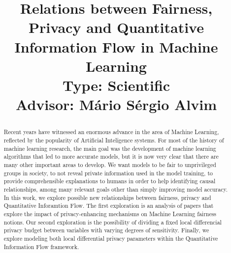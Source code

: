 \documentclass[conference]{IEEEtran}
\begin{document}
%
%
%
%
%
%
%
%



\title{Relations between Fairness, Privacy and Quantitative Information Flow in Machine Learning
            \\\large Type: Scientific\\Advisor: Mário Sérgio Alvim

}

\author{
}

\maketitle

\begin{abstract}
            Recent years have witnessed an enormous advance in the area of Machine Learning, reflected by the popularity of Artificial Inteligence systems. For most of the history of machine learning research, the main goal was the development of machine learning algorithms that led to more accurate models, but it is now very clear that there are many other important areas to develop. We want models to be fair to unprivileged groups in society, to not reveal private information used in the model training, to provide comprehensible explanations to humans in order to help identifying causal relationships, among many relevant goals other than simply improving model accuracy. In this work, we explore possible new relationships between fairness, privacy and Quantitative Inforamtion Flow. The first exploration is an analysis of papers that explore the impact of privacy-enhancing mechanisms on Machine Learning fairness notions. Our second exploration is the possibility of dividing a fixed local differencial privacy budget between variables with varying degrees of sensitivity. Finally, we explore modeling both local differential privacy parameters within the Quantitative Information Flow framework.
\end{abstract}
\end{document}
